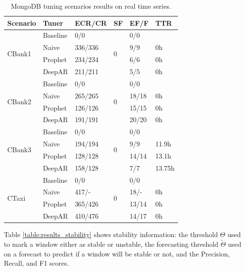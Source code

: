 \documentclass[a4paper, 12pt]{article} %
\newcommand{\ra}[1]{\renewcommand{\arraystretch}{#1}}
\begin{document}
	\begin{table}\centering 
		\ra{1.3}
		\begin{tabularx}{\textwidth}{@{}XXXXXX@{}}
			\toprule
			Scenario & Tuner & ECR/CR & SF & EF/F & TTR\\
			
			\midrule
			\multirow{4}{*}{CBank1}
			& Baseline & 0/0 & \multirow{4}{*}{0}  & 0/0 & \\
			& Naive & 336/336 && 9/9 & 0h \\
			& Prophet & 234/234 && 6/6 & 0h \\
			& DeepAR & 211/211 && 5/5 & 0h \\
			
			\midrule
			\multirow{4}{*}{CBank2}
			& Baseline & 0/0 & \multirow{4}{*}{0}  & 0/0 & \\
			& Naive & 265/265 && 18/18 & 0h \\
			& Prophet & 126/126 && 15/15 & 0h \\
			& DeepAR & 191/191 && 20/20 & 0h \\
			
			\midrule
			\multirow{4}{*}{CBank3}
			& Baseline & 0/0 & \multirow{4}{*}{0}  & 0/0 & \\
			& Naive & 194/194 && 9/9 & 11.9h \\
			& Prophet & 128/128 && 14/14 & 13.1h \\
			& DeepAR & 158/128 && 7/7 & 13.75h \\
			
			\midrule
			\multirow{4}{*}{CTaxi}
			& Baseline & 0/0 & \multirow{4}{*}{0}  & 0/0 & \\
			& Naive & 417/- && 18/- & 0h \\
			& Prophet & 365/426 && 13/14 & 0h \\
			& DeepAR & 410/476 && 14/17 & 0h \\
			
			\bottomrule
		\end{tabularx}
		\caption{MongoDB tuning scenarios results on real time series.} \label{table:results_cassandra_real}
	\end{table}
	
	Table \ref{table:results_stability} shows stability information: the threshold $\Theta$ used to mark a window either as stable or unstable, the forecasting threshold $\tilde \Theta$ used on a forecast to predict if a window will be stable or not, and the Precision, Recall, and F1 scores. 
\end{document}
